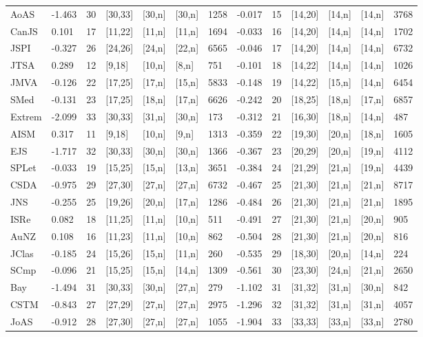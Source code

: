\begin{longtable}[]{@{}lllllllllllll@{}}
AoAS & -1.463 & 30 & {[}30,33{]} & {[}30,n{]} & {[}30,n{]} & 1258 &
-0.017 & 15 & {[}14,20{]} & {[}14,n{]} & {[}14,n{]} & 3768 \\
CanJS & 0.101 & 17 & {[}11,22{]} & {[}11,n{]} & {[}11,n{]} & 1694 &
-0.033 & 16 & {[}14,20{]} & {[}14,n{]} & {[}14,n{]} & 1702 \\
JSPI & -0.327 & 26 & {[}24,26{]} & {[}24,n{]} & {[}22,n{]} & 6565 &
-0.046 & 17 & {[}14,20{]} & {[}14,n{]} & {[}14,n{]} & 6732 \\
JTSA & 0.289 & 12 & {[}9,18{]} & {[}10,n{]} & {[}8,n{]} & 751 & -0.101 &
18 & {[}14,22{]} & {[}14,n{]} & {[}14,n{]} & 1026 \\
JMVA & -0.126 & 22 & {[}17,25{]} & {[}17,n{]} & {[}15,n{]} & 5833 &
-0.148 & 19 & {[}14,22{]} & {[}15,n{]} & {[}14,n{]} & 6454 \\
SMed & -0.131 & 23 & {[}17,25{]} & {[}18,n{]} & {[}17,n{]} & 6626 &
-0.242 & 20 & {[}18,25{]} & {[}18,n{]} & {[}17,n{]} & 6857 \\
Extrem & -2.099 & 33 & {[}30,33{]} & {[}31,n{]} & {[}30,n{]} & 173 &
-0.312 & 21 & {[}16,30{]} & {[}18,n{]} & {[}14,n{]} & 487 \\
AISM & 0.317 & 11 & {[}9,18{]} & {[}10,n{]} & {[}9,n{]} & 1313 & -0.359
& 22 & {[}19,30{]} & {[}20,n{]} & {[}18,n{]} & 1605 \\
EJS & -1.717 & 32 & {[}30,33{]} & {[}30,n{]} & {[}30,n{]} & 1366 &
-0.367 & 23 & {[}20,29{]} & {[}20,n{]} & {[}19,n{]} & 4112 \\
SPLet & -0.033 & 19 & {[}15,25{]} & {[}15,n{]} & {[}13,n{]} & 3651 &
-0.384 & 24 & {[}21,29{]} & {[}21,n{]} & {[}19,n{]} & 4439 \\
CSDA & -0.975 & 29 & {[}27,30{]} & {[}27,n{]} & {[}27,n{]} & 6732 &
-0.467 & 25 & {[}21,30{]} & {[}21,n{]} & {[}21,n{]} & 8717 \\
JNS & -0.255 & 25 & {[}19,26{]} & {[}20,n{]} & {[}17,n{]} & 1286 &
-0.484 & 26 & {[}21,30{]} & {[}21,n{]} & {[}21,n{]} & 1895 \\
ISRe & 0.082 & 18 & {[}11,25{]} & {[}11,n{]} & {[}10,n{]} & 511 & -0.491
& 27 & {[}21,30{]} & {[}21,n{]} & {[}20,n{]} & 905 \\
AuNZ & 0.108 & 16 & {[}11,23{]} & {[}11,n{]} & {[}10,n{]} & 862 & -0.504
& 28 & {[}21,30{]} & {[}21,n{]} & {[}20,n{]} & 816 \\
JClas & -0.185 & 24 & {[}15,26{]} & {[}15,n{]} & {[}11,n{]} & 260 &
-0.535 & 29 & {[}18,30{]} & {[}20,n{]} & {[}14,n{]} & 224 \\
SCmp & -0.096 & 21 & {[}15,25{]} & {[}15,n{]} & {[}14,n{]} & 1309 &
-0.561 & 30 & {[}23,30{]} & {[}24,n{]} & {[}21,n{]} & 2650 \\
Bay & -1.494 & 31 & {[}30,33{]} & {[}30,n{]} & {[}27,n{]} & 279 & -1.102
& 31 & {[}31,32{]} & {[}31,n{]} & {[}30,n{]} & 842 \\
CSTM & -0.843 & 27 & {[}27,29{]} & {[}27,n{]} & {[}27,n{]} & 2975 &
-1.296 & 32 & {[}31,32{]} & {[}31,n{]} & {[}31,n{]} & 4057 \\
JoAS & -0.912 & 28 & {[}27,30{]} & {[}27,n{]} & {[}27,n{]} & 1055 &
-1.904 & 33 & {[}33,33{]} & {[}33,n{]} & {[}33,n{]} & 2780 \\
\end{longtable}

